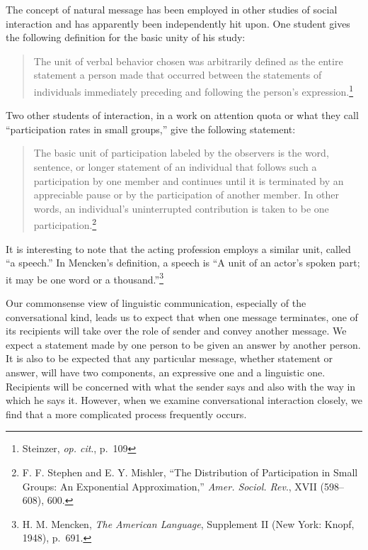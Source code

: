 \documentclass[twoside,symmetric,nobib,justified]{tufte-book}
\begin{document}
The concept of natural message has been employed in other studies of
social interaction and has apparently been independently hit upon. One
student gives the following definition for the basic unity of his study:

\begin{quote}
The unit of verbal behavior chosen was arbitrarily defined as the entire
statement a person made that occurred between the statements of
individuals immediately preceding and following the person's
expression.\footnote{Steinzer, \emph{op. cit}., p.~109}
\end{quote}

\noindent Two other students of interaction, in a work on attention quota or what
they call ``participation rates in small groups,'' give the following
statement:

\begin{quote}
The basic unit of participation labeled by the observers is the word,
sentence, or longer statement of an individual that follows such a
participation by one member and continues until it is terminated by an
appreciable pause or by the participation of another member. In other
words, an individual's uninterrupted contribution is taken to be one
participation.\footnote{F. F. Stephen and E. Y. Mishler, ``The
  Distribution of Participation in Small Groups: An Exponential
  Approximation,'' \emph{Amer. Sociol. Rev}., XVII (598--608), 600.}
\end{quote}

\noindent It is interesting to note that the acting profession employs a similar
unit, called ``a speech.'' In Mencken's definition, a speech is ``A unit
of an actor's spoken part; it may be one word or a
thousand.''\footnote{H. M. Mencken, \emph{The American Language},
  Supplement II (New York: Knopf, 1948), p.~691.}

Our commonsense view of linguistic communication, especially of the
conversational kind, leads us to expect that when one message
terminates, one of its recipients will take over the role of sender and
convey another message. We expect a statement made by one person to be
given an answer by another person. It is also to be expected that any
particular message, whether statement or answer, will have two
components, an expressive one and a linguistic one. Recipients will be
concerned with what the sender says and also with the way in which he
says it. However, when we examine conversational interaction closely, we
find that a more complicated process frequently occurs.
\end{document}
